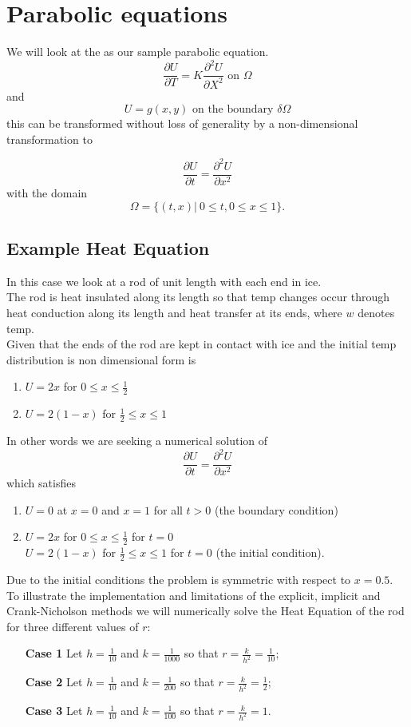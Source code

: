 \chapter{Parabolic equations}
We will look at the  as our sample parabolic equation.
\[ \frac{\partial U}{\partial T}=K\frac{\partial^2U }{\partial X^2} \mbox{ on } \Omega \]
and 
\[ U=g(x,y) \mbox{ on the boundary } \delta\Omega \]
this can be transformed without loss of generality by a non-dimensional transformation to

\begin{equation}\label{heat} \frac{\partial U}{\partial t}=\frac{\partial^2U }{\partial x^2}\end{equation}
with the domain
\[\Omega=\{(t,x)| \ 0\leq t, 0 \leq x \leq 1\}. \]

\section{Example Heat Equation} 
In this case we look at a rod of unit length with each end in ice.\\
The rod is heat insulated along its length so that temp changes occur through
heat conduction along its length and heat transfer at its ends, where $w$ denotes
temp.\\
Given that the ends of the rod are kept in contact with ice and the initial temp
distribution is non dimensional form is
\begin{enumerate}
\item $U=2x$ for $0\leq x \leq \frac{1}{2}$ 
\item $U=2(1-x)$ for $\frac{1}{2}\leq x \leq 1$ 
\end{enumerate}
In other words we are seeking a numerical solution of
\[\frac{\partial U}{\partial t}=\frac{\partial^2U }{\partial x^2}\]
which satisfies
\begin{enumerate}
\item $U=0$ at $x=0$ and $x=1$ for all $t>0$ (the boundary condition)
\item $U=2x$ for $0\leq x \leq \frac{1}{2}$ for $t=0$\\
$U=2(1-x)$ for $\frac{1}{2}\leq x \leq 1$ for $t=0$ (the initial condition).
\end{enumerate}
Due to the initial conditions the problem is symmetric with respect to $x=0.5.$ 
To illustrate the implementation and limitations of the explicit, implicit and Crank-Nicholson methods we will numerically solve the Heat Equation of the rod for three different values of $r$:
\begin{enumerate}
\item[\textbf{Case 1}]
Let $h=\frac{1}{10}$ and $k=\frac{1}{1000}$ so that $r=\frac{k}{h^2}=\frac{1}{10}$;
\item[\textbf{Case 2}]
Let $h=\frac{1}{10}$ and $k=\frac{1}{200}$ so that $r=\frac{k}{h^2}=\frac{1}{2}$;
\item[\textbf{Case 3}]
Let $h=\frac{1}{10}$ and $k=\frac{1}{100}$ so that $r=\frac{k}{h^2}=1$.
\end{enumerate}


